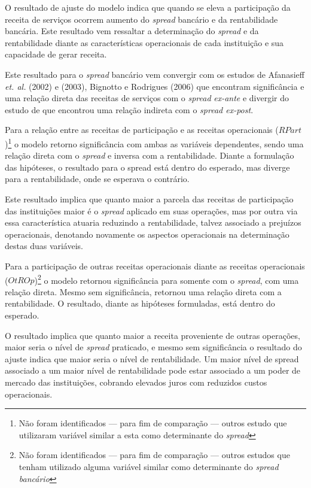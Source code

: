 \documentclass[
  12pt,
  12pt,
  openright,
  oneside,
  a4paper,
  chapter=TITLE,
  section=TITLE,
  subsection=TITLE,
  subsubsection=TITLE,
  english,
  portugues,
  sumario=tradicional]{abntex2}
\begin{document}
O resultado de ajuste do modelo indica que quando se eleva a participação da receita de serviços ocorrem aumento do \emph{spread} bancário e da rentabilidade bancária. Este resultado vem ressaltar a determinação do \emph{spread} e da rentabilidade diante as características operacionais de cada instituição e sua capacidade de gerar receita.

Este resultado para o \emph{spread} bancário vem convergir com os estudos de Afanasieff \emph{et. al.} (2002) e (2003), Bignotto e Rodrigues (2006) que encontram significância e uma relação direta das receitas de serviços com o \emph{spread} \emph{ex-ante} e divergir do estudo de \textcite{almeida:2013} que encontrou uma relação indireta com o \emph{spread ex-post}.

Para a relação entre as receitas de participação e as receitas operacionais (\(RPart\))\footnote{Não foram identificados — para fim de comparação  — outros estudo que utilizaram variável similar a esta como determinante do \emph{spread}} o modelo retorno significância com ambas as variáveis dependentes, sendo uma relação direta com o \emph{spread} e inversa com a rentabilidade. Diante a formulação das hipóteses, o resultado para o spread está dentro do esperado, mas diverge para a rentabilidade, onde se esperava o contrário.

Este resultado implica que quanto maior a parcela das receitas de participação das instituições maior é o \emph{spread} aplicado em suas operações, mas por outra via essa característica atuaria reduzindo a rentabilidade, talvez associado a prejuízos operacionais, denotando novamente os aspectos operacionais na determinação destas duas variáveis.

Para a participação de outras receitas operacionais diante as receitas operacionais (\(OtROp\))\footnote{Não foram identificados — para fim de comparação — outros estudos que tenham utilizado alguma variável similar como determinante do \emph{spread bancário}} o modelo retornou significância para somente com o \emph{spread}, com uma relação direta. Mesmo sem significância, retornou uma relação direta com a rentabilidade. O resultado, diante as hipóteses formuladas, está dentro do esperado.

O resultado implica que quanto maior a receita proveniente de outras operações, maior seria o nível de \emph{spread} praticado, e mesmo sem significância o resultado do ajuste indica que maior seria o nível de rentabilidade. Um maior nível de spread associado a um maior nível de rentabilidade pode estar associado a um poder de mercado das instituições, cobrando elevados juros com reduzidos custos operacionais.
\end{document}
